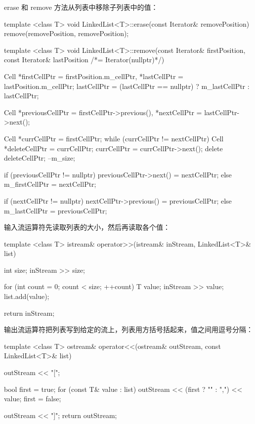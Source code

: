 erase 和 remove 方法从列表中移除子列表中的值：

\begin{codebox}
template <class T>
void LinkedList<T>::erase(const Iterator& removePosition) {
  remove(removePosition, removePosition);
}

template <class T>
void LinkedList<T>::remove(const Iterator& firstPosition,
           const Iterator& lastPosition /*= Iterator(nullptr)*/) {
  Cell *firstCellPtr = firstPosition.m_cellPtr,
      *lastCellPtr = lastPosition.m_cellPtr;
  lastCellPtr = (lastCellPtr == nullptr)
                ? m_lastCellPtr : lastCellPtr;

  Cell *previousCellPtr = firstCellPtr->previous(),
      *nextCellPtr = lastCellPtr->next();

  Cell *currCellPtr = firstCellPtr;
  while (currCellPtr != nextCellPtr) {
    Cell *deleteCellPtr = currCellPtr;
    currCellPtr = currCellPtr->next();
    delete deleteCellPtr;
    --m_size;
  }

  if (previousCellPtr != nullptr) {
    previousCellPtr->next() = nextCellPtr;
  }
  else {
    m_firstCellPtr = nextCellPtr;
  }

  if (nextCellPtr != nullptr) {
    nextCellPtr->previous() = previousCellPtr;
  }
  else {
    m_lastCellPtr = previousCellPtr;
  }
}
\end{codebox}

输入流运算符先读取列表的大小，然后再读取各个值：

\begin{codebox}
template <class T>
istream& operator>>(istream& inStream, LinkedList<T>& list) {
  int size;
  inStream >> size;

  for (int count = 0; count < size; ++count) {
    T value;
    inStream >> value;
    list.add(value);
  }

  return inStream;
}
\end{codebox}

输出流运算符把列表写到给定的流上，列表用方括号括起来，值之间用逗号分隔：

\begin{codebox}
template <class T>
ostream& operator<<(ostream& outStream, const LinkedList<T>& list) {
  outStream << "[";

  bool first = true;
  for (const T& value : list) {
    outStream << (first ? "" : ",") << value;
    first = false;
  }

  outStream << "]";
  return outStream;
}
\end{codebox}

